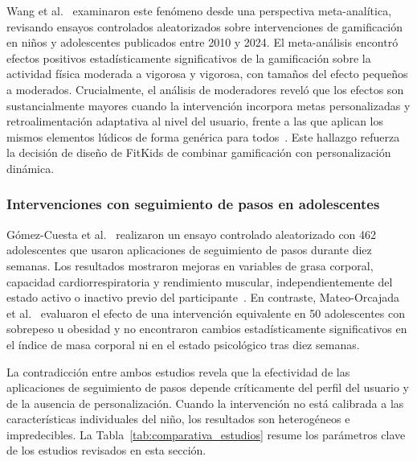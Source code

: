 				Wang et al.~\cite{WangGamif2025} examinaron este fenómeno desde una perspectiva meta-analítica, revisando ensayos controlados aleatorizados sobre intervenciones de gamificación en niños y adolescentes publicados entre 2010 y 2024. El meta-análisis encontró efectos positivos estadísticamente significativos de la gamificación sobre la actividad física moderada a vigorosa y vigorosa, con tamaños del efecto pequeños a moderados. Crucialmente, el análisis de moderadores reveló que los efectos son sustancialmente mayores cuando la intervención incorpora metas personalizadas y retroalimentación adaptativa al nivel del usuario, frente a las que aplican los mismos elementos lúdicos de forma genérica para todos~\cite{WangGamif2025}. Este hallazgo refuerza la decisión de diseño de FitKids de combinar gamificación con personalización dinámica.
			
			\subsubsection{Intervenciones con seguimiento de pasos en adolescentes}
				Gómez-Cuesta et al.~\cite{GomezCuesta2024} realizaron un ensayo controlado aleatorizado con 462 adolescentes que usaron aplicaciones de seguimiento de pasos durante diez semanas. Los resultados mostraron mejoras en variables de grasa corporal, capacidad cardiorrespiratoria y rendimiento muscular, independientemente del estado activo o inactivo previo del participante~\cite{GomezCuesta2024}. En contraste, Mateo-Orcajada et al.~\cite{MateoOrcajada2024} evaluaron el efecto de una intervención equivalente en 50 adolescentes con sobrepeso u obesidad y no encontraron cambios estadísticamente significativos en el índice de masa corporal ni en el estado psicológico tras diez semanas.
				
				La contradicción entre ambos estudios revela que la efectividad de las aplicaciones de seguimiento de pasos depende críticamente del perfil del usuario y de la ausencia de personalización. Cuando la intervención no está calibrada a las características individuales del niño, los resultados son heterogéneos e impredecibles. La Tabla~\ref{tab:comparativa_estudios} resume los parámetros clave de los estudios revisados en esta sección.
				
